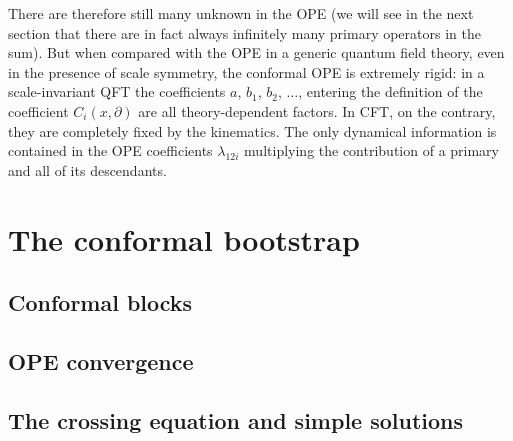 \documentclass[a4paper,12pt]{article}
\numberwithin{equation}{section}
\begin{document}
There are therefore still many unknown in the OPE (we will see in the next section that there are in fact always infinitely many primary operators in the sum). But when compared with the OPE in a generic quantum field theory, even in the presence of scale symmetry, the conformal OPE is extremely rigid: in a scale-invariant QFT the coefficients $a$, $b_1$, $b_2$, $\ldots$, entering the definition of the coefficient $C_i(x, \partial)$ are all theory-dependent factors. In CFT, on the contrary, they are completely fixed by the kinematics. The only dynamical information is contained in the OPE coefficients $\lambda_{12i}$ multiplying the contribution of a primary and all of its descendants.



\section{The conformal bootstrap}
\label{sec:bootstrap}

%
%
%
%
%
%
%


\subsection{Conformal blocks}

%
%
%
%


\subsection{OPE convergence}


\subsection{The crossing equation and simple solutions}


%
%
\end{document}
